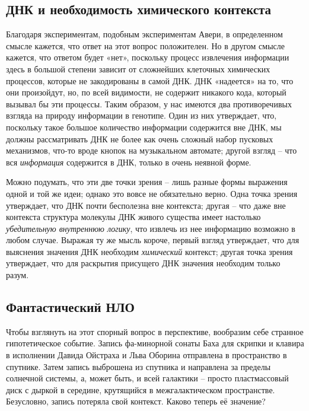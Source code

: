 \documentclass[../main.tex]{subfiles}
\begin{document}
\subsection{ДНК и необходимость химического контекста}

Благодаря экспериментам, подобным экспериментам Авери, в определенном смысле кажется, что ответ на этот вопрос положителен. Но в другом смысле кажется, что ответом будет «нет», поскольку процесс извлечения информации здесь в большой степени зависит от сложнейших клеточных химических процессов, которые не закодированы в самой ДНК\@. ДНК «надеется» на то, что они произойдут, но, по всей видимости, не содержит никакого кода, который вызывал бы эти процессы. Таким образом, у нас имеются два противоречивых взгляда на природу информации в генотипе. Один из них утверждает, что, поскольку такое большое количество информации содержится вне ДНК, мы должны рассматривать ДНК не более как очень сложный набор пусковых механизмов, что-то вроде кнопок на музыкальном автомате; другой взгляд \--- что вся \emph{информация} содержится в ДНК, только в очень неявной форме.

Можно подумать, что эти две точки зрения \--- лишь разные формы выражения одной и той же идеи; однако это вовсе не обязательно верно. Одна точка зрения утверждает, что ДНК почти бесполезна вне контекста; другая \--- что даже вне контекста структура молекулы ДНК живого существа имеет настолько \emph{убедительную внутреннюю логику}, что извлечь из нее информацию возможно в любом случае. Выражая ту же мысль короче, первый взгляд утверждает, что для выяснения значения ДНК необходим \emph{химический} контекст; другая точка зрения утверждает, что для раскрытия присущего ДНК значения необходим только разум.


\subsection{Фантастический НЛО}

Чтобы взглянуть на этот спорный вопрос в перспективе, вообразим себе странное гипотетическое событие. Запись фа-минорной сонаты Баха для скрипки и клавира в исполнении Давида Ойстраха и Льва Оборина отправлена в пространство в спутнике. Затем запись выброшена из спутника и направлена за пределы солнечной системы, а, может быть, и всей галактики \--- просто пластмассовый диск с дыркой в середине, крутящийся в межгалактическом пространстве. Безусловно, запись потеряла свой контекст. Каково теперь её значение?
\end{document}
